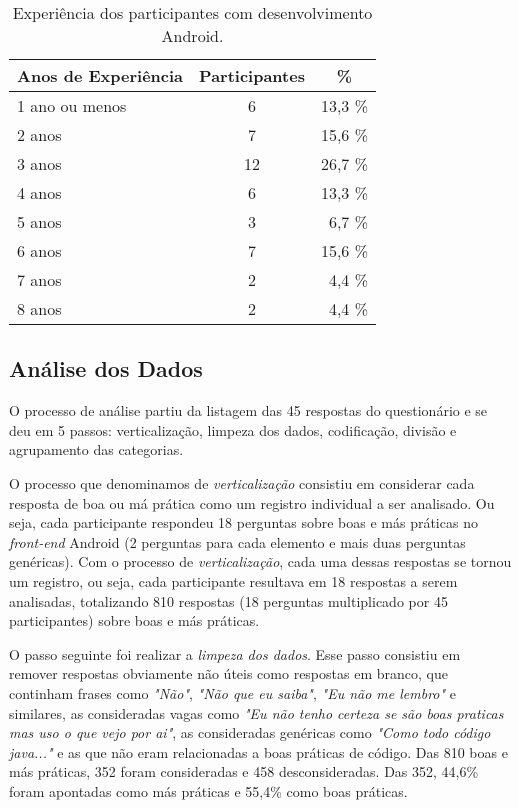 \begin{table}[h]
\centering
\small
\begin{tabular}{@{}l|c|r@{}}
\toprule
\textbf{Anos de Experi\^encia} & \textbf{Participantes} & \multicolumn{1}{c}{\textbf{\%}}  \\
\hline
1 ano ou menos 	&	 6 		& 	13,3 \%	 \\
2 anos 			& 	 7 		& 	15,6 \%	 \\
3 anos 			& 	 12		& 	26,7 \%	 \\
4 anos 			& 	 6 		& 	13,3 \%	 \\
5 anos 			& 	 3 		& 	 6,7 \%	 \\
6 anos 			& 	 7 		& 	15,6 \%	 \\
7 anos 			& 	 2 		& 	 4,4 \%	 \\
8 anos 			& 	 2 		& 	 4,4 \%	 \\
\toprule
\end{tabular}
\caption{Experi\^encia dos participantes com desenvolvimento Android.}
\label{tab:DadosDemograficos}
\end{table}

\subsection{An\'alise dos Dados}
\label{sub:smells-definition}

O processo de an\'alise partiu da listagem das 45 respostas do question\'ario e se deu em 5 passos: verticaliza\c{c}\~ao, limpeza dos dados, codifica\c{c}\~ao, divis\~ao e agrupamento das categorias. 

O processo que denominamos de \textit{verticaliza\c{c}\~ao} consistiu em considerar cada resposta de boa ou m\'a pr\'atica como um registro individual a ser analisado. Ou seja, cada participante respondeu 18 perguntas sobre boas e m\'as pr\'aticas no \textit{front-end} Android (2 perguntas para cada elemento e mais duas perguntas gen\'ericas). Com o processo de \textit{verticaliza\c{c}\~ao}, cada uma dessas respostas se tornou um registro, ou seja, cada participante resultava em 18 respostas a serem analisadas, totalizando 810 respostas (18 perguntas multiplicado por 45 participantes) sobre boas e m\'as pr\'aticas.

O passo seguinte foi realizar a \textit{limpeza dos dados}. Esse passo consistiu em remover respostas obviamente n\~ao \'uteis como respostas em branco, que continham frases como \textit{"N\~ao"}, \textit{"N\~ao que eu saiba"}, \textit{"Eu n\~ao me lembro"} e similares, as consideradas vagas como \textit{"Eu n\~ao tenho certeza se s\~ao boas praticas mas uso o que vejo por ai"}, as consideradas gen\'ericas como \textit{"Como todo c\'odigo java..."} e as que n\~ao eram relacionadas a boas pr\'aticas de c\'odigo. Das 810 boas e m\'as pr\'aticas, 352 foram consideradas e 458 desconsideradas. Das 352, 44,6\% foram apontadas como m\'as pr\'aticas e 55,4\% como boas pr\'aticas. 

